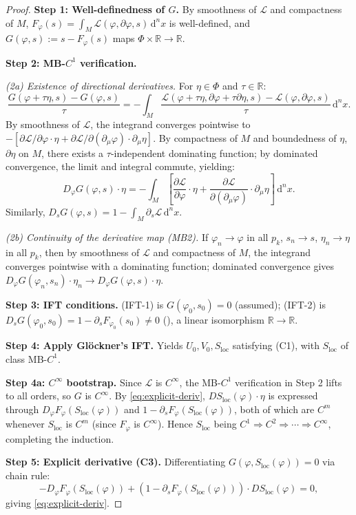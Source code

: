 \documentclass[12pt,letterpaper]{article}
\theoremstyle{definition}
\newcommand{\mL}{\mathcal{L}}
\newcommand{\mPhi}{\Phi}
\newcommand{\R}{\mathbb{R}}
\newcommand{\diff}{\mathrm{d}}
\newcommand{\dVol}{\,\diff^n x}
\begin{document}
\begin{proof}
\textbf{Step 1: Well-definedness of $G$.} By smoothness of $\mL$ and compactness of $M$, $F_\varphi(s) = \int_M \mL(\varphi, \partial\varphi, s) \dVol$ is well-defined, and $G(\varphi, s) := s - F_\varphi(s)$ maps $\mPhi \times \R \to \R$.

\textbf{Step 2: MB-$C^1$ verification.}

\emph{(2a) Existence of directional derivatives.} For $\eta \in \mPhi$ and $\tau \in \R$:
\[ \frac{G(\varphi + \tau\eta, s) - G(\varphi, s)}{\tau} = -\int_M \frac{\mL(\varphi + \tau\eta, \partial\varphi + \tau\partial\eta, s) - \mL(\varphi, \partial\varphi, s)}{\tau} \dVol. \]
By smoothness of $\mL$, the integrand converges pointwise to $-[\partial\mL/\partial\varphi \cdot \eta + \partial\mL/\partial(\partial_\mu\varphi) \cdot \partial_\mu\eta]$. By compactness of $M$ and boundedness of $\eta$, $\partial\eta$ on $M$, there exists a $\tau$-independent dominating function; by dominated convergence, the limit and integral commute, yielding:
\[ D_\varphi G(\varphi, s) \cdot \eta = -\int_M \left[\frac{\partial\mL}{\partial\varphi} \cdot \eta + \frac{\partial\mL}{\partial(\partial_\mu\varphi)} \cdot \partial_\mu\eta\right] \dVol. \]
Similarly, $D_s G(\varphi, s) = 1 - \int_M \partial_s \mL \dVol$.

\emph{(2b) Continuity of the derivative map (MB2).} If $\varphi_n \to \varphi$ in all $p_k$, $s_n \to s$, $\eta_n \to \eta$ in all $p_k$, then by smoothness of $\mL$ and compactness of $M$, the integrand converges pointwise with a dominating function; dominated convergence gives $D_\varphi G(\varphi_n, s_n) \cdot \eta_n \to D_\varphi G(\varphi, s) \cdot \eta$.

\textbf{Step 3: IFT conditions.} (IFT-1) is $G(\varphi_0, s_0) = 0$ (assumed); (IFT-2) is $D_s G(\varphi_0, s_0) = 1 - \partial_s F_{\varphi_0}(s_0) \neq 0$ (), a linear isomorphism $\R \to \R$.

\textbf{Step 4: Apply Gl\"ockner's IFT.} Yields $U_0, V_0, S_{\mathrm{loc}}$ satisfying (C1), with $S_{\mathrm{loc}}$ of class MB-$C^1$.

\textbf{Step 4a: $C^\infty$ bootstrap.} Since $\mL$ is $C^\infty$, the MB-$C^1$ verification in Step 2 lifts to all orders, so $G$ is $C^\infty$. By \eqref{eq:explicit-deriv}, $DS_{\mathrm{loc}}(\varphi)\cdot\eta$ is expressed through $D_\varphi F_\varphi(S_{\mathrm{loc}}(\varphi))$ and $1 - \partial_s F_\varphi(S_{\mathrm{loc}}(\varphi))$, both of which are $C^m$ whenever $S_{\mathrm{loc}}$ is $C^m$ (since $F_\varphi$ is $C^\infty$). Hence $S_{\mathrm{loc}}$ being $C^1 \Rightarrow C^2 \Rightarrow \cdots \Rightarrow C^\infty$, completing the induction.

\textbf{Step 5: Explicit derivative (C3).} Differentiating $G(\varphi, S_{\mathrm{loc}}(\varphi)) = 0$ via chain rule:
\[ -D_\varphi F_\varphi(S_{\mathrm{loc}}(\varphi)) + (1 - \partial_s F_\varphi(S_{\mathrm{loc}}(\varphi))) \cdot DS_{\mathrm{loc}}(\varphi) = 0, \]
giving \eqref{eq:explicit-deriv}.
\end{proof}
\end{document}
